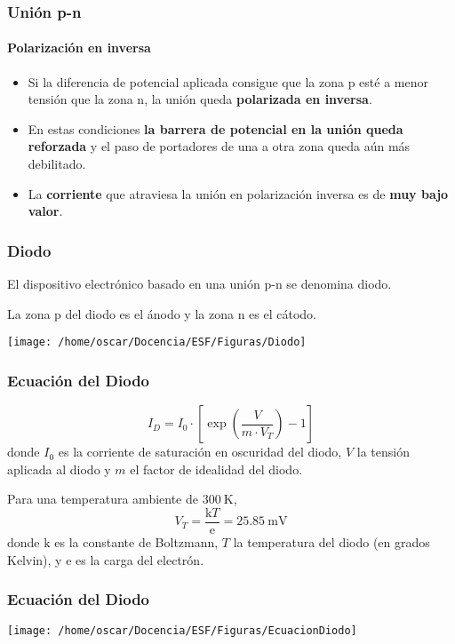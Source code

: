 \documentclass[xcolor=dvipsnames]{beamer}
\begin{document}
\begin{frame}
  \frametitle{Unión p-n}


  \framesubtitle{Polarización en inversa}
  \begin{itemize}
  \item Si la diferencia de potencial aplicada consigue que la zona p
    esté a menor tensión que la zona n, la unión queda
    \textbf{polarizada en inversa}.
  \item En estas condiciones \textbf{la barrera de potencial en la
      unión queda reforzada} y el paso de portadores de una a otra
    zona queda aún más debilitado.
  \item La \textbf{corriente }que atraviesa la unión en polarización
    inversa es de \textbf{muy bajo valor}.
  \end{itemize}

\end{frame}

\begin{frame}
  \frametitle{Diodo}
  \begin{block} {}

    El dispositivo electrónico basado en una unión p-n se denomina
    diodo.

    La zona p del diodo es el ánodo y la zona n es el cátodo.

  \end{block}
  \begin{center}
    \texttt{[image: /home/oscar/Docencia/ESF/Figuras/Diodo]}
    \par\end{center}


\end{frame}

\begin{frame}
  \frametitle{Ecuación del Diodo}

\[
I_{D}=I_{0}\cdot[\exp(\frac{V}{m\cdot V_{T}})-1]\] donde $I_{0}$ es la
corriente de saturación en oscuridad del diodo, $V$ la tensión
aplicada al diodo y $m$ el factor de idealidad del diodo.

Para una temperatura ambiente de $\SI{300}{\kelvin}$, \[
V_{T}=\frac{\mathrm{k}T}{\mathrm{e}}=\SI{25.85}{\milli\volt}\] donde
$\mathrm{k}$ es la constante de Boltzmann, $T$ la temperatura del
diodo (en grados Kelvin), y $\mathrm{e}$ es la carga del electrón.


\end{frame}

\begin{frame}
  \frametitle{Ecuación del Diodo}

  \begin{center}
    \texttt{[image: /home/oscar/Docencia/ESF/Figuras/EcuacionDiodo]}
    \par\end{center}


\end{frame}
\end{document}
